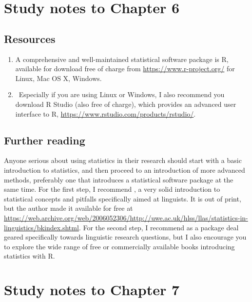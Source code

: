 \section*{Study notes to Chapter 6}
\label{sec:studynotes06}

\subsection*{Resources}

\begin{enumerate}
  \item A comprehensive and well-maintained statistical software package is R, available for download free of charge from \url{https://www.r-project.org/} for Linux, Mac OS X, Windows.
  \item Especially if you are using Linux or Windows, I also recommend you download R Studio (also free of charge), which provides an advanced user interface to R, \url{https://www.rstudio.com/products/rstudio/}.
\end{enumerate}


\subsection*{Further reading}

Anyone serious about using statistics in their research should start with a basic introduction to statistics, and then proceed to an introduction of more advanced methods, preferably one that introduces a statistical software package at the same time. For the first step, I recommend \citet{butler_statistics_1985}, a very solid introduction to statistical concepts and pitfalls specifically aimed at linguists. It is out of print, but the author made it available for free at \href{https://web.archive.org/web/20060523061748/http://uwe.ac.uk/hlss/llas/statistics-in-linguistics/bkindex.shtml}{https://web.archive.org/web/2006052306/http://uwe.ac.uk/hlss/llas/statistics-in-linguistics/bkindex.shtml}. For the second step, I recommend \citet{gries_statistics_2013} as a package deal geared specifically towards linguistic research questions, but I also encourage you to explore the wide range of free or commercially available books introducing statistics with R.


\section*{Study notes to Chapter 7}
\label{sec:studynotes07}

